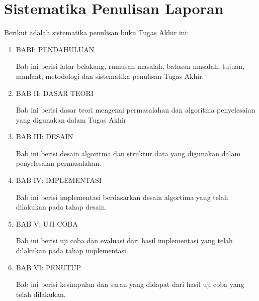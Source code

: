 	\section{\quad Sistematika Penulisan Laporan}
	\quad Berikut adalah sistematika penulisan buku Tugas Akhir ini:
	\begin{enumerate}
		\item BABI: PENDAHULUAN
		
		Bab ini berisi latar belakang, rumusan masalah, batasan masalah, tujuan, manfaat, metodologi dan sistematika penulisan Tugas Akhir.
		
		\item BAB II: DASAR TEORI
		
		Bab ini berisi dasar teori mengenai permasalahan dan algoritma penyelesaian yang digunakan dalam Tugas Akhir
		
		\item BAB III: DESAIN
		
		Bab ini berisi desain algoritma dan struktur data yang digunakan dalam penyelesaian permasalahan.
		
		\item BAB IV: IMPLEMENTASI
		
		Bab ini berisi implementasi berdasarkan desain algortima yang telah dilakukan pada tahap desain.
		
		\item BAB V: UJI COBA
		
		Bab ini berisi uji coba dan evaluasi dari hasil implementasi yang telah dilakukan pada tahap implementasi.
		
		\item BAB VI: PENUTUP
		
		Bab ini berisi kesimpulan dan saran yang didapat dari hasil uji coba yang telah dilakukan.
	\end{enumerate}

\cleardoublepage
